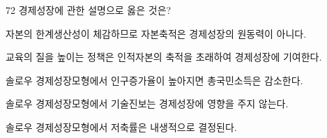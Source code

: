 \begin{question}{72}
경제성장에 관한 설명으로 옳은 것은?
\begin{choices}
  \item 자본의 한계생산성이 체감하므로 자본축적은 경제성장의 원동력이 아니다.
  \item 교육의 질을 높이는 정책은 인적자본의 축적을 초래하여 경제성장에 기여한다.
  \item 솔로우 경제성장모형에서 인구증가율이 높아지면 총국민소득은 감소한다.
  \item 솔로우 경제성장모형에서 기술진보는 경제성장에 영향을 주지 않는다.
  \item 솔로우 경제성장모형에서 저축률은 내생적으로 결정된다.
\end{choices}
\end{question}
